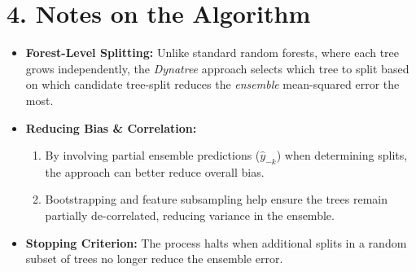 \documentclass{article}
\begin{document}
\section*{4. Notes on the Algorithm}

\begin{itemize}
    \item \textbf{Forest-Level Splitting:}
    Unlike standard random forests, where each tree grows independently, the \textit{Dynatree} approach selects which tree to split based on which candidate tree-split reduces the \textit{ensemble} mean-squared error the most.
    \item \textbf{Reducing Bias \& Correlation:}
    \begin{enumerate}
        \item By involving partial ensemble predictions (\(\hat{y}_{-k}\)) when determining splits, the approach can better reduce overall bias.
        \item Bootstrapping and feature subsampling help ensure the trees remain partially de-correlated, reducing variance in the ensemble.
    \end{enumerate}
    \item \textbf{Stopping Criterion:}
    The process halts when additional splits in a random subset of trees no longer reduce the ensemble error.
\end{itemize}
\end{document}
